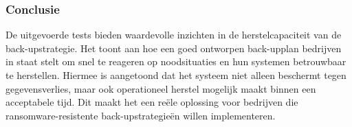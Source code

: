 \subsubsection{Conclusie}
De uitgevoerde tests bieden waardevolle inzichten in de herstelcapaciteit van de back-upstrategie. Het toont aan hoe een goed ontworpen back-upplan bedrijven in staat stelt om snel te reageren op noodsituaties en hun systemen betrouwbaar te herstellen. Hiermee is aangetoond dat het systeem niet alleen beschermt tegen gegevensverlies, maar ook operationeel herstel mogelijk maakt binnen een acceptabele tijd. Dit maakt het een reële oplossing voor bedrijven die ransomware-resistente back-upstrategieën willen implementeren.































